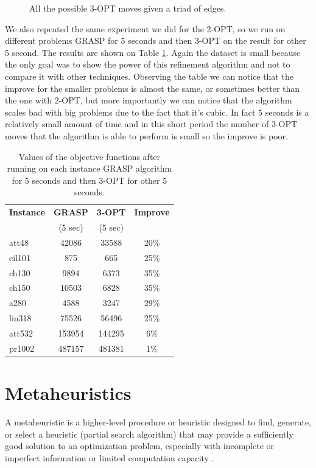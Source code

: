 \begin{figure}[h!]
\begin{subfigure}[b]{0.24\linewidth}
    \caption{}
  \end{subfigure}
  \caption{All the possible 3-OPT moves given a triad of edges.}
  \label{fig:threeopt}
\end{figure}
 
\noindent We also repeated the same experiment we did for the 2-OPT, so we run on different problems GRASP for 5 seconds and then 3-OPT on the result for other 5 second. The results are shown on Table \ref{tab:threeopt}. Again the dataset is small because the only goal was to show the power of this refinement algorithm and not to compare it with other techniques. Observing the table we can notice that the improve for the smaller problems is almost the same, or sometimes better than the one with 2-OPT, but more importantly we can notice that the algorithm scales bad with big problems due to the fact that it's cubic. In fact 5 seconds is a relatively small amount of time and in this short period the number of 3-OPT moves that the algorithm is able to perform is small so the improve is poor.

\begin{table}[h!]
	\begin{center}
		\begin{tabular}{l|c|c|c}
			\textbf{Instance} & \textbf{GRASP} & \textbf{3-OPT} & \textbf{Improve}	\\
			& (5 sec) & (5 sec) & \\
			\hline
			att48 & 42086 & 33588 & 20\% \\
			eil101 & 875 & 665 & 25\% \\
			ch130 & 9894 & 6373 & 35\% \\
			ch150 & 10503 & 6828 & 35\% \\
			a280 & 4588 & 3247 & 29\% \\
			lin318 & 75526 & 56496 & 25\% \\ 
			att532 & 153954 & 144295 & 6\% \\	
			pr1002 & 487157 & 481381 & 1\% \\
		\end{tabular}
		\caption{Values of the objective functions after running on each instance GRASP algorithm for 5 seconds and then 3-OPT for other 5 seconds.}
		\label{tab:threeopt}
	\end{center}
\end{table}

\newpage

\section{Metaheuristics}
A metaheuristic is a higher-level procedure or heuristic designed to find, generate, or select a heuristic (partial search algorithm) that may provide a sufficiently good solution to an optimization problem, especially with incomplete or imperfect information or limited computation capacity \cite{meta}.

